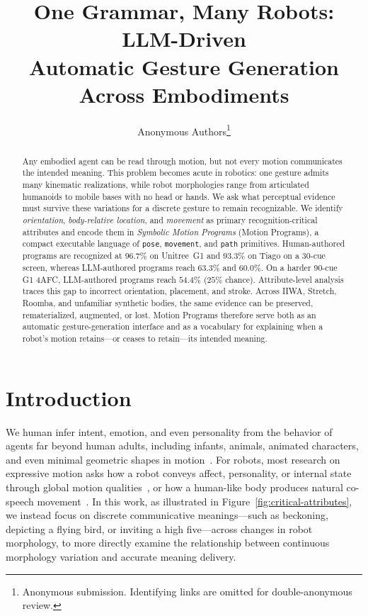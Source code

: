 \documentclass[letterpaper,10pt,conference]{ieeeconf}
\title{One Grammar, Many Robots: LLM-Driven\\Automatic Gesture Generation Across Embodiments}
\author{Anonymous Authors\thanks{Anonymous submission. Identifying links are omitted for double-anonymous review.}}
\newcommand{\method}{Motion Program}
\newcommand{\methodfull}{Symbolic Motion Program}
\begin{document}
\maketitle
\thispagestyle{empty}
\pagestyle{empty}

\begin{abstract}
Any embodied agent can be read through motion, but not every motion communicates the intended meaning. This problem becomes acute in robotics: one gesture admits many kinematic realizations, while robot morphologies range from articulated humanoids to mobile bases with no head or hands. We ask what perceptual evidence must survive these variations for a discrete gesture to remain recognizable. We identify \emph{orientation}, \emph{body-relative location}, and \emph{movement} as primary recognition-critical attributes and encode them in \textit{\methodfull{}s} (\method{}s), a compact executable language of \texttt{pose}, \texttt{movement}, and \texttt{path} primitives. Human-authored programs are recognized at $96.7\%$ on Unitree~G1 and $93.3\%$ on Tiago on a 30-cue screen, whereas LLM-authored programs reach $63.3\%$ and $60.0\%$. On a harder 90-cue G1 4AFC, LLM-authored programs reach $54.4\%$ ($25\%$ chance). Attribute-level analysis traces this gap to incorrect orientation, placement, and stroke. Across IIWA, Stretch, Roomba, and unfamiliar synthetic bodies, the same evidence can be preserved, rematerialized, augmented, or lost. Motion Programs therefore serve both as an automatic gesture-generation interface and as a vocabulary for explaining when a robot's motion retains---or ceases to retain---its intended meaning.
\end{abstract}

\section{Introduction}
We human infer intent, emotion, and even personality from the behavior of agents far beyond human adults, including infants, animals, animated characters, and even minimal geometric shapes in motion~\cite{heider1944apparent}. For robots, most research on expressive motion asks how a robot conveys affect, personality, or internal state through global motion qualities~\cite{zhou2017timing,knight2014xytheta,knight2016laban}, or how a human-like body produces natural co-speech movement~\cite{kucherenko2020gesticulator,yoon2020trimodal,liu2022beat}. In this work, as illustrated in Figure~\ref{fig:critical-attributes}, we instead focus on discrete communicative meanings---such as beckoning, depicting a flying bird, or inviting a high five---across changes in robot morphology, to more directly examine the relationship between continuous morphology variation and accurate meaning delivery.
\end{document}

